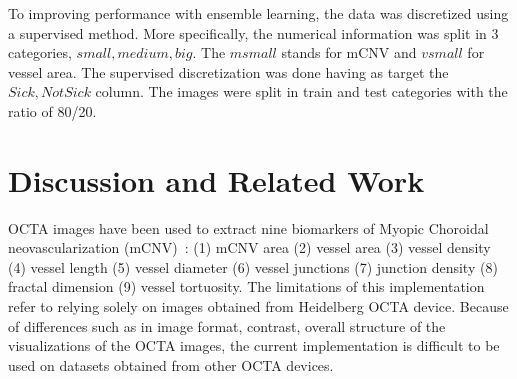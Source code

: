 \documentclass[conference]{IEEEtran}
\begin{document}

To improving performance with ensemble learning, the data was discretized using a supervised method. More specifically, the numerical information was split in 3 categories, \(small, medium, big\). The \(m small\) stands for mCNV and \(v small\) for vessel area. The supervised discretization was done having as target the \(Sick, NotSick\) column.
The images were split in train and test categories with the ratio of 80/20. 

\section{Discussion and Related Work}
OCTA images have been used to extract
 nine biomarkers  of Myopic Choroidal neovascularization (mCNV)~\cite{deshpande2023imagej}:
(1) mCNV area
(2) vessel area %
(3) vessel density %
(4) vessel length %
(5) vessel diameter %
(6) vessel junctions %
(7) junction density %
 (8) fractal dimension %
(9) vessel tortuosity. %
The limitations of this implementation refer to relying solely on images obtained from Heidelberg OCTA device. Because of differences such as in image format, contrast, overall structure of the visualizations of the OCTA images, the current implementation is difficult to be used on datasets obtained from other OCTA devices.
\end{document}
